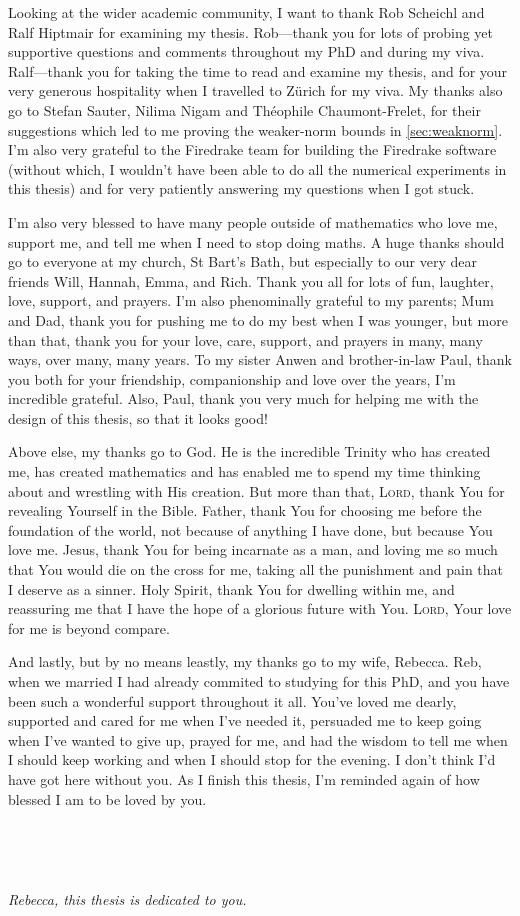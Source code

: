 {  Looking at the wider academic community, I want to thank Rob Scheichl and Ralf Hiptmair for examining my thesis. Rob---thank you for lots of probing yet supportive questions and comments throughout my PhD and during my viva. Ralf---thank you for taking the time to read and examine my thesis, and for your very generous hospitality when I travelled to Z\"urich for my viva. My thanks also go to Stefan Sauter, Nilima Nigam and Th\'eophile Chaumont-Frelet, for their suggestions which led to me proving the weaker-norm bounds in \cref{sec:weaknorm}. I'm also very grateful to the Firedrake team for building the Firedrake software (without which, I wouldn't have been able to do all the numerical experiments in this thesis) and for very patiently answering my questions when I got stuck.
  
I'm also very blessed to have many people outside of mathematics who love me, support me, and tell me when I need to stop doing maths. A huge thanks should go to everyone at my church, St Bart's Bath, but especially to our very dear friends Will, Hannah, Emma, and Rich. Thank you all for lots of fun, laughter, love, support, and prayers. I'm also phenominally grateful to my parents; Mum and Dad, thank you for pushing me to do my best when I was younger, but more than that, thank you for your love, care, support, and prayers in many, many ways, over many, many years. To my sister Anwen and brother-in-law Paul, thank you both for your friendship, companionship and love over the years, I'm incredible grateful. Also, Paul, thank you very much for helping me with the design of this thesis, so that it looks good!

Above else, my thanks go to God. He is the incredible Trinity who has created me, has created mathematics and has enabled me to spend my time thinking about and wrestling with His creation. But more than that, L\textsc{ord}, thank You for revealing Yourself in the Bible. Father, thank You for choosing me before the foundation of the world, not because of anything I have done, but because You love me. Jesus, thank You for being incarnate as a man, and loving me so much that You would die on the cross for me, taking all the punishment and pain that I deserve as a sinner. Holy Spirit, thank You for dwelling within me, and reassuring me that I have the hope of a glorious future with You. L\textsc{ord}, Your love for me is beyond compare.
\thispagestyle{plain} %

And lastly, but by no means leastly, my thanks go to my wife, Rebecca. Reb, when we married I had already commited to studying for this PhD, and you have been such a wonderful support throughout it all. You've loved me dearly, supported and cared for me when I've needed it, persuaded me to keep going when I've wanted to give up, prayed for me, and had the wisdom to tell me when I should keep working and when I should stop for the evening. I don't think I'd have got here without you. As I finish this thesis, I'm reminded again of how blessed I am to be loved by you.

\

\

\begin{center}
  {\it Rebecca, this thesis is dedicated to you.}
  \end{center}
}
